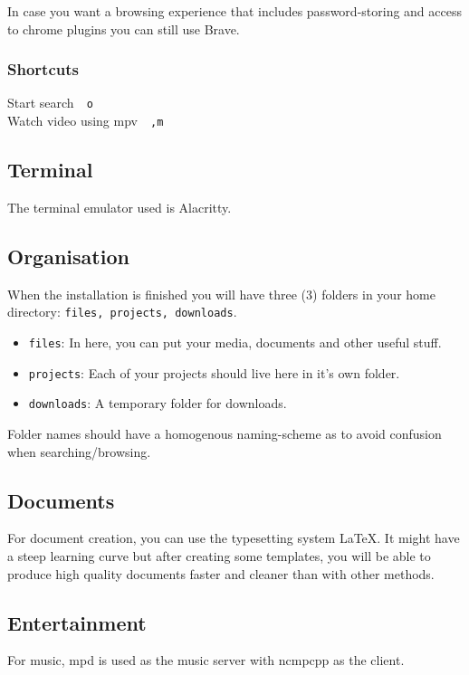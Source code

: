\documentclass{article}
\let\src\texttt
\newcommand{\shortcut}[2]{#1~\dotfill{}~\src{#2}\\} %
\newcommand{\terminalemulator}{Alacritty}
\newcommand{\altbrowser}{Brave}
\newcommand{\videoplayer}{mpv}
\begin{document}
In case you want a browsing experience that includes password-storing 
and access to chrome plugins you can still use \altbrowser.

\subsubsection{Shortcuts}

\shortcut{Start search}{o}
\shortcut{Watch video using \videoplayer}{,m}

\subsection{Terminal}

The terminal emulator used is \terminalemulator. 

\subsection{Organisation}

When the installation is finished you will have three (3)
folders in your home directory: \src{files, projects, downloads}.

\begin{itemize}
    \item \src{files}: In here, you can put your media, documents and other useful stuff.
    \item \src{projects}: Each of your projects should live here in it's own folder.
    \item \src{downloads}: A temporary folder for downloads.
\end{itemize}

Folder names should have a homogenous naming-scheme as to avoid confusion when 
searching/browsing.

\subsection{Documents}

For document creation, you can use the typesetting system \LaTeX. 
It might have a steep learning curve but after creating some templates, 
you will be able to produce high quality documents faster and cleaner 
than with other methods.

\subsection{Entertainment}
For music, mpd is used as the music server with ncmpcpp
as the client. 
\end{document}
